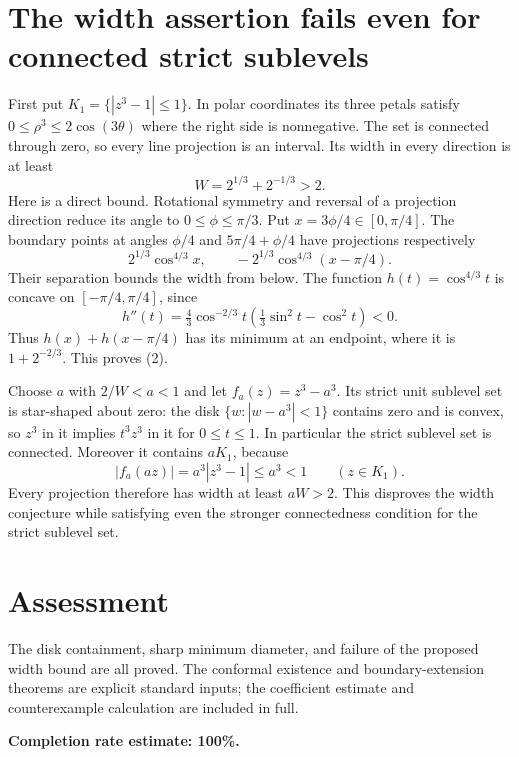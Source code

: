 \documentclass[11pt]{article}
\begin{document}
\section*{The width assertion fails even for connected strict sublevels}
First put $K_1=\{|z^3-1|\le1\}$. In polar coordinates its three petals satisfy $0\le\rho^3\le2\cos(3\theta)$ where the right side is nonnegative. The set is connected through zero, so every line projection is an interval. Its width in every direction is at least
\[
 W=2^{1/3}+2^{-1/3}>2.\tag{2}
\]
Here is a direct bound. Rotational symmetry and reversal of a projection direction reduce its angle to $0\le\phi\le\pi/3$. Put $x=3\phi/4\in[0,\pi/4]$. The boundary points at angles $\phi/4$ and $5\pi/4+\phi/4$ have projections respectively
\[
 2^{1/3}\cos^{4/3}x,\qquad
 -2^{1/3}\cos^{4/3}(x-\pi/4).
\]
Their separation bounds the width from below. The function $h(t)=\cos^{4/3}t$ is concave on $[-\pi/4,\pi/4]$, since
\[
 h''(t)=\tfrac43\cos^{-2/3}t
       (\tfrac13\sin^2t-\cos^2t)<0.
\]
Thus $h(x)+h(x-\pi/4)$ has its minimum at an endpoint, where it is $1+2^{-2/3}$. This proves (2).

Choose $a$ with $2/W<a<1$ and let $f_a(z)=z^3-a^3$. Its strict unit sublevel set is star-shaped about zero: the disk $\{w:|w-a^3|<1\}$ contains zero and is convex, so $z^3$ in it implies $t^3z^3$ in it for $0\le t\le1$. In particular the strict sublevel set is connected. Moreover it contains $aK_1$, because
\[
 |f_a(az)|=a^3|z^3-1|\le a^3<1\qquad(z\in K_1).
\]
Every projection therefore has width at least $aW>2$. This disproves the width conjecture while satisfying even the stronger connectedness condition for the strict sublevel set.

\section*{Assessment}
The disk containment, sharp minimum diameter, and failure of the proposed width bound are all proved. The conformal existence and boundary-extension theorems are explicit standard inputs; the coefficient estimate and counterexample calculation are included in full.

\textbf{Completion rate estimate: 100\%.}
\end{document}
